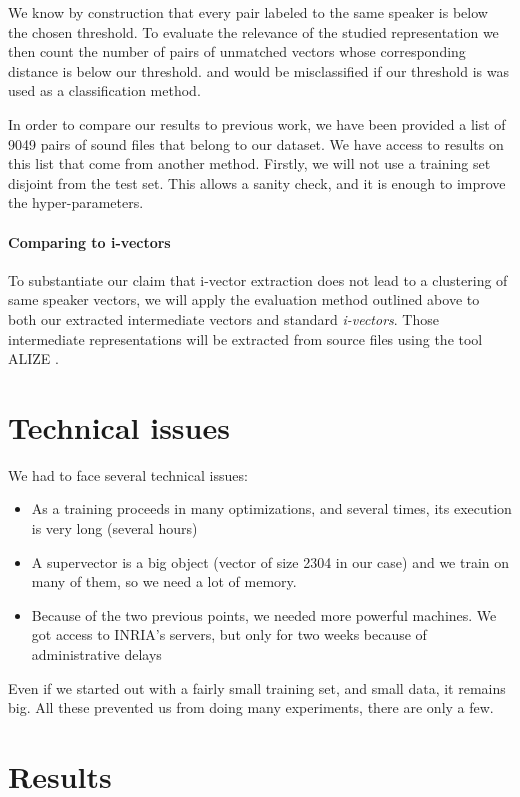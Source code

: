 \documentclass[conference]{IEEEtran}
\begin{document}
We know by construction that every pair labeled to the same speaker is below the
chosen threshold. To evaluate the relevance of the studied representation we
then count the number of pairs of unmatched vectors whose corresponding distance
is below our threshold. and would be misclassified if our threshold is was used
as a classification method.

In order to compare our results to previous work, we have been provided a list
of 9049 pairs of sound files that belong to our dataset. We have access to results
on this list that come from another method. Firstly,  we will not use a training
set disjoint from the test set. This allows a sanity check, and it is enough to
improve the hyper-parameters.

\paragraph{Comparing to i-vectors}

 To substantiate our claim that i-vector extraction does not lead to a
 clustering of same speaker vectors, we will apply the evaluation method
 outlined above to both our
 extracted intermediate vectors and standard \emph{i-vectors}. Those
 intermediate representations will be extracted from source files using the tool
 ALIZE \cite{larcher2013alize}.


\section{Technical issues}
\label{sec:Issues}

We had to face several technical issues:
\begin{itemize}
\item As a training proceeds in many optimizations, and several times, its execution is very long (several hours)
\item A supervector is a big object (vector of size 2304 in our case) and we train on many of them, so we need a lot of memory.
\item Because of the two previous points, we needed more powerful machines. We got access to INRIA's servers,
but only for two weeks because of administrative delays
\end{itemize}
Even if we started out with a fairly small training set, and small data, it remains big.
All these prevented us from doing many experiments, there are only a few.


\section{Results}
\label{sec:Results}
\end{document}
